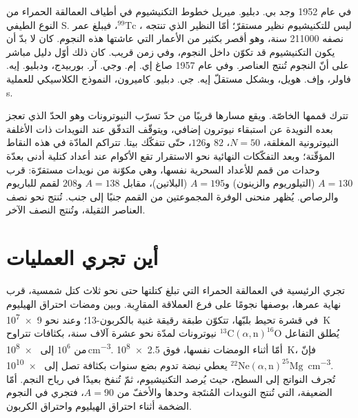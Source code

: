 \begin{history}
في عام 1952 وجد بي. دبليو. ميريل خطوط التكنيشيوم في أطياف
العمالقة الحمراء من النوع الطيفي S. ليس للتكنيشيوم نظير مستقرّ؛ أمّا النظير
الذي تنتجه ، $^{99}\mathrm{Tc}$، فيبلغ عمر نصفه
\num{211000} سنة، وهو أقصر بكثير من الأعمار التي عاشتها هذه النجوم.
كان لا بدّ أن يكون التكنيشيوم قد تكوّن داخل النجوم، وفي
زمن قريب. كان ذلك أوّل دليل مباشر على أنّ النجوم تُنتج العناصر. وفي
عام 1957 صاغ إي. إم. وجي. آر. بوربيدج، ودبليو. إيه. فاولر، وإف. هويل،
وبشكل مستقلّ إيه. جي. دبليو. كاميرون، النموذج الكلاسيكي
للعملية s.
\end{history}

تترك  قممها الخاصّة. ويقع مسارها قريبًا من حدّ تسرّب النيوترونات
وهو الحدّ الذي تعجز بعده النويدة عن استبقاء نيوترون إضافي،
ويتوقّف التدفّق عند النويدات ذات الأغلفة النيوترونية المغلقة، $N = 50$، $82$
و$126$، حتّى تتفكّك بيتا. تتراكم المادّة في هذه النقاط المؤقّتة؛
وبعد التفكّكات النهائية نحو الاستقرار تقع الأكوام عند أعداد كتلية أدنى بعدّة
وحدات من قمم  للأعداد السحرية نفسها، وهي
مكوّنة من نويدات مستقرّة: قرب $A = 130$ (التيلوريوم والزينون)
و$A = 195$ (البلاتين)، مقابل $A = 138$ و$208$ لقمم 
للباريوم والرصاص. يُظهر منحنى الوفرة المجموعتين من القمم جنبًا إلى
جنب. تُنتج  نحو نصف العناصر الثقيلة، وتُنتج 
النصف الآخر.

\section{أين تجري العمليات}\label{sec:b3:origin-of-elements:sites}

تجري  الرئيسية في العمالقة الحمراء التي تبلغ كتلتها حتى نحو ثلاث كتل شمسية،
قرب نهاية عمرها، بوصفها نجومًا على فرع العملاقة المقارِبة. وبين
ومضات احتراق الهيليوم في قشرة تحيط بلبّها، تتكوّن طبقة رقيقة غنية بالكربون-13؛
وعند نحو \qty{9e7}{K} يُطلق التفاعل
$^{13}\mathrm{C}(\alpha,\mathrm{n})^{16}\mathrm{O}$ نيوترونات
لمدّة نحو عشرة آلاف سنة، بكثافات تتراوح من $10^6$ إلى
\num{e8}\,\unit{cm^{-3}}. أمّا أثناء الومضات نفسها، فوق
\qty{2.5e8}{K}، فإنّ $^{22}\mathrm{Ne}(\alpha,\mathrm{n})^{25}\mathrm{Mg}$
يعطي نبضة تدوم بضع سنوات بكثافة تصل إلى \qty{e10}{cm^{-3}}.
تُجرف النواتج إلى السطح، حيث يُرصد التكنيشيوم، ثمّ تُنفخ بعيدًا
في رياح النجم. أمّا  الضعيفة، التي تُنتج النويدات المُنتَجة  وحدها
والأخفّ من $A = 90$، فتجري في النجوم الضخمة أثناء احتراق الهيليوم
واحتراق الكربون.

